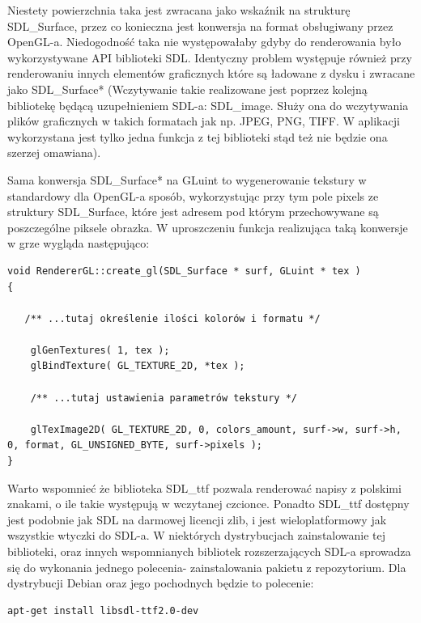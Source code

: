 Niestety powierzchnia taka jest zwracana jako wskaźnik na strukturę SDL\_Surface, przez co konieczna jest konwersja na format obsługiwany przez OpenGL-a. Niedogodność taka nie występowałaby gdyby do renderowania było wykorzystywane API biblioteki SDL. Identyczny problem występuje również przy renderowaniu innych elementów graficznych które są ładowane z dysku i zwracane jako SDL\_Surface* (Wczytywanie takie realizowane jest poprzez kolejną bibliotekę będącą uzupełnieniem SDL-a: SDL\_image. Służy ona do wczytywania plików graficznych w takich formatach jak np. JPEG, PNG, TIFF. W aplikacji wykorzystana jest tylko jedna funkcja 
z tej biblioteki stąd też nie będzie ona szerzej omawiana).

Sama konwersja SDL\_Surface* na GLuint to wygenerowanie tekstury w standardowy dla OpenGL-a sposób, wykorzystując przy tym pole pixels ze struktury SDL\_Surface, które jest adresem pod którym przechowywane są poszczególne piksele obrazka. W uproszczeniu funkcja realizująca taką konwersje w grze wygląda następująco:

\begingroup
\fontsize{10pt}{12pt}\selectfont
\begin{verbatim}  
void RendererGL::create_gl(SDL_Surface * surf, GLuint * tex )
{
 
   /** ...tutaj określenie ilości kolorów i formatu */
  
    glGenTextures( 1, tex );
    glBindTexture( GL_TEXTURE_2D, *tex );

    /** ...tutaj ustawienia parametrów tekstury */

    glTexImage2D( GL_TEXTURE_2D, 0, colors_amount, surf->w, surf->h, 0, format, GL_UNSIGNED_BYTE, surf->pixels );
}
\end{verbatim}

Warto wspomnieć że biblioteka SDL\_ttf pozwala renderować napisy z polskimi znakami, o ile takie występują w wczytanej czcionce. Ponadto SDL\_ttf dostępny jest podobnie jak SDL na darmowej licencji zlib, i jest wieloplatformowy jak wszystkie wtyczki do SDL-a. W niektórych dystrybucjach zainstalowanie tej biblioteki, oraz innych wspomnianych bibliotek rozszerzających SDL-a sprowadza się do wykonania jednego polecenia- zainstalowania pakietu z repozytorium. Dla dystrybucji Debian oraz jego pochodnych będzie to polecenie:
\begin{verbatim}
apt-get install libsdl-ttf2.0-dev 
\end{verbatim}
